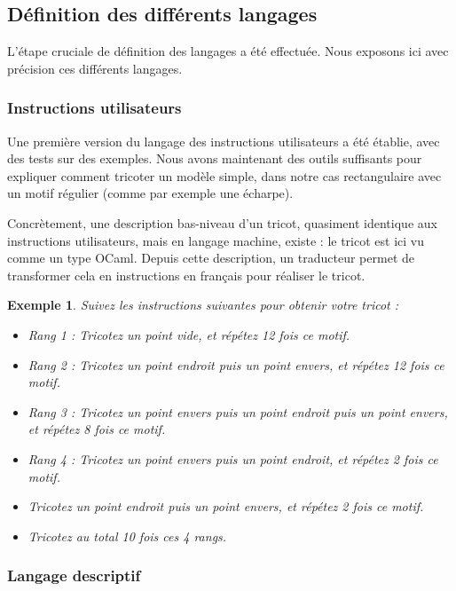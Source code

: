 \documentclass{article}
\newtheorem{ex}{Exemple}
\begin{document}
\subsection{Définition des différents langages}

L'étape cruciale de définition des langages a été effectuée. Nous exposons ici avec précision ces différents langages.

\subsubsection{Instructions utilisateurs}

Une première version du langage des instructions utilisateurs a été établie, avec des tests sur des exemples. Nous avons maintenant des outils
suffisants pour expliquer comment tricoter un modèle simple, dans notre cas rectangulaire avec un motif régulier (comme par exemple une écharpe).

Concrètement, une description bas-niveau d'un tricot, quasiment identique aux instructions utilisateurs, mais en langage machine, existe : le tricot
est ici vu comme un type OCaml. Depuis cette description, un traducteur permet de transformer cela en instructions en français pour réaliser le tricot.

\begin{ex}
  Suivez les instructions suivantes pour obtenir votre tricot : 
  
  \begin{itemize}
  \item Rang 1 : Tricotez un point vide, et répétez 12 fois ce motif. 
  \item Rang 2 : Tricotez un point endroit puis un point envers, et répétez 12 fois ce motif. 
  \item Rang 3 : Tricotez un point envers puis un point endroit puis un point envers, et répétez 8 fois ce motif. 
  \item Rang 4 : Tricotez un point envers puis un point endroit, et répétez 2 fois ce motif. 
  \item Tricotez un point endroit puis un point envers, et répétez 2 fois ce motif. 
  \item Tricotez au total 10 fois ces 4 rangs.
  \end{itemize}
\end{ex}

\subsubsection{Langage descriptif}
\end{document}

